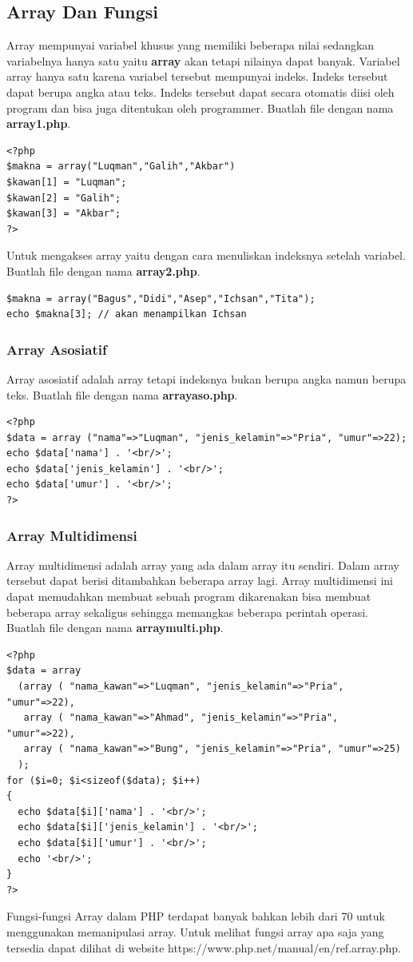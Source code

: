 \subsection{Array Dan Fungsi}
Array mempunyai variabel khusus yang memiliki beberapa nilai sedangkan variabelnya hanya satu yaitu \textbf{array} akan tetapi nilainya dapat banyak. Variabel array hanya satu karena variabel tersebut mempunyai indeks. Indeks tersebut dapat berupa angka atau teks. Indeks tersebut dapat secara otomatis diisi oleh program dan bisa juga ditentukan oleh programmer.  Buatlah file dengan nama \textbf{array1.php}.
\begin{lstlisting}
<?php
$makna = array("Luqman","Galih","Akbar")
$kawan[1] = "Luqman";
$kawan[2] = "Galih";
$kawan[3] = "Akbar";
?>
\end{lstlisting}
Untuk mengakses array yaitu dengan cara menuliskan indeksnya setelah variabel. Buatlah file dengan nama \textbf{array2.php}.
\begin{lstlisting}
$makna = array("Bagus","Didi","Asep","Ichsan","Tita");
echo $makna[3]; // akan menampilkan Ichsan
\end{lstlisting}

\subsubsection{Array Asosiatif}
Array asosiatif adalah array tetapi indeksnya bukan berupa angka namun berupa teks. Buatlah file dengan nama \textbf{arrayaso.php}.
\begin{lstlisting}
<?php
$data = array ("nama"=>"Luqman", "jenis_kelamin"=>"Pria", "umur"=>22);
echo $data['nama'] . '<br/>';
echo $data['jenis_kelamin'] . '<br/>';
echo $data['umur'] . '<br/>';
?>
\end{lstlisting}

\subsubsection{Array Multidimensi}
Array multidimensi adalah array yang ada dalam array itu sendiri. Dalam array tersebut dapat berisi ditambahkan beberapa array lagi. Array multidimensi ini dapat memudahkan membuat sebuah program dikarenakan bisa membuat beberapa array sekaligus sehingga memangkas beberapa perintah operasi.
Buatlah file dengan nama \textbf{arraymulti.php}.
\begin{lstlisting}
<?php
$data = array
  (array ( "nama_kawan"=>"Luqman", "jenis_kelamin"=>"Pria", "umur"=>22),
   array ( "nama_kawan"=>"Ahmad", "jenis_kelamin"=>"Pria", "umur"=>22),
   array ( "nama_kawan"=>"Bung", "jenis_kelamin"=>"Pria", "umur"=>25)
  );
for ($i=0; $i<sizeof($data); $i++)
{
  echo $data[$i]['nama'] . '<br/>';
  echo $data[$i]['jenis_kelamin'] . '<br/>';
  echo $data[$i]['umur'] . '<br/>';
  echo '<br/>';
}
?>
\end{lstlisting} 
Fungsi-fungsi Array dalam PHP terdapat banyak bahkan lebih dari 70 untuk menggunakan memanipulasi array. Untuk melihat fungsi array apa saja yang tersedia dapat dilihat di website https://www.php.net/manual/en/ref.array.php.

